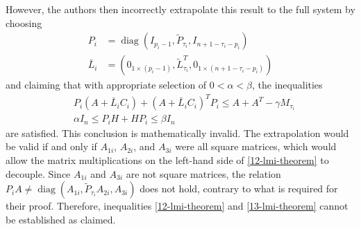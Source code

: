 \documentclass[journal]{IEEEtran}
\newcommand{\diag}{\operatorname{diag}}	%
\begin{document}
However, the authors then incorrectly extrapolate this result to the full system by choosing 
\begin{align*}
    P_i&=\diag(I_{p_i-1}, \tilde{P}_{\tau_i}, I_{n+1-\tau_i-p_i}) \\
    \bar{L}_i &= (0_{1\times(p_i-1)}, \tilde{L}_{\tau_i}^T, 0_{1\times(n+1-\tau_i-p_i)})
\end{align*}
and claiming that with appropriate selection of $0<\alpha<\beta$, the inequalities
\begin{align}
    & P_i (A+\bar{L}_i C_i) + (A+\bar{L}_i C_i)^T P_i \leq A + A^T - \gamma M_{\tau_i} \label{12-lmi-theorem} \\
    & \alpha I_n \leq P_i H + H P_i \leq \beta I_n \label{13-lmi-theorem}
\end{align}
are satisfied. This conclusion is mathematically invalid. The extrapolation would be valid if and only if $A_{1i}$, $A_{2i}$, and $A_{3i}$ were all square matrices, which would allow the matrix multiplications on the left-hand side of \eqref{12-lmi-theorem} to decouple. Since $A_{1i}$ and $A_{3i}$ are not square matrices, the relation $P_i A \neq \diag(A_{1i},\tilde{P}_{\tau_i} A_{2i},A_{3i})$ does not hold, contrary to what is required for their proof. Therefore, inequalities \eqref{12-lmi-theorem} and \eqref{13-lmi-theorem} cannot be established as claimed.
\end{document}

